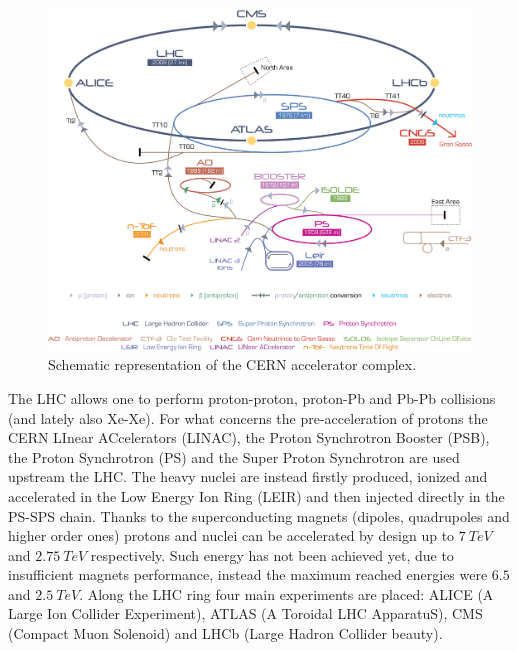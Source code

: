 \begin{figure}[!t]
\begin{center}
\includegraphics[width=\linewidth]{Chapters/Introduction/Figs/Cern-Accelerator-Complex.pdf}
\caption{Schematic representation of the CERN accelerator complex.}
\label{fig:accelerators}
\end{center}
\end{figure}

The LHC allows one to perform proton-proton, proton-Pb and Pb-Pb collisions (and lately also Xe-Xe).
For what concerns the pre-acceleration of protons the CERN LInear ACcelerators (LINAC), the Proton Synchrotron Booster (PSB), the Proton Synchrotron (PS) and the Super Proton Synchrotron are used upstream the LHC.
The heavy nuclei are instead firstly produced, ionized and accelerated in the Low Energy Ion Ring (LEIR) and then injected directly in the PS-SPS chain.
Thanks to the superconducting magnets (dipoles, quadrupoles and higher order ones) protons and nuclei can be accelerated by design up to $7\ TeV$ and $2.75\ TeV$ respectively.
Such energy has not been achieved yet, due to insufficient magnets performance, instead the maximum reached energies were $6.5$ and $2.5\ TeV$.
Along the LHC ring four main experiments are placed: ALICE (A Large Ion Collider Experiment),  ATLAS (A Toroidal LHC ApparatuS), CMS (Compact Muon Solenoid) and LHCb (Large Hadron Collider beauty).

